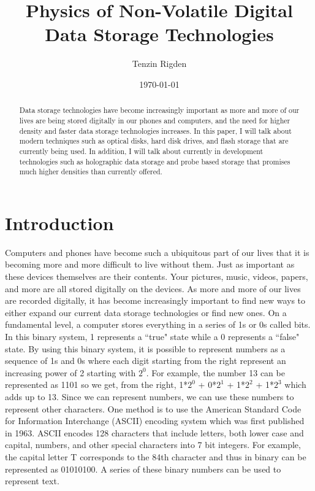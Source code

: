 \documentclass[ notitlepage, numerical, 11pt]{revtex4-1} %
\begin{document}
\title{Physics of Non-Volatile Digital Data Storage Technologies}
\author{Tenzin Rigden}
\date{\today}
\begin{abstract}
Data storage technologies have become increasingly important as more and more of our lives are being stored digitally in our phones and computers, and the need for higher density and faster data storage technologies increases. In this paper, I will talk about modern techniques such as optical disks, hard disk drives, and flash storage that are currently being used. In addition, I will talk about currently in development technologies such as holographic data storage and probe based storage that promises much higher densities than currently offered. 

\end{abstract}

\maketitle
\section{Introduction}
Computers and phones have become such a ubiquitous part of our lives that it is becoming more and more difficult to live without them. Just as important as these devices themselves are their contents. Your pictures, music, videos, papers, and more are all stored digitally on the devices. As more and more of our lives are recorded digitally, it has become increasingly important to find new ways to either expand our current data storage technologies or find new ones. On a fundamental level, a computer stores everything in a series of 1s or 0s called bits. In this binary system, 1 represents a ``true" state while a 0 represents a ``false" state. By using this binary system, it is possible to represent numbers as a sequence of 1s and 0s where each digit starting from the right represent an increasing power of 2 starting with $2^0$. For example, the number 13 can be represented as 1101 so we get, from the right, 1*$2^0$ + 0*$2^1$ + 1*$2^2$ + 1*$2^3$ which adds up to 13. Since we can represent numbers, we can use these numbers to represent other characters. One method is to use the American Standard Code for Information Interchange (ASCII) encoding system which was first published in 1963. ASCII encodes 128 characters that include letters, both lower case and capital, numbers, and other special characters into 7 bit integers. For example, the capital letter T corresponds to the 84th character and thus in binary can be represented as 01010100. A series of these binary numbers can be used to represent text.
\end{document}

